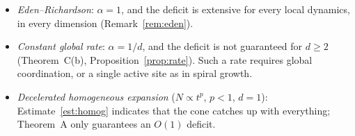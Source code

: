 \begin{remark}\label{rem:local}
\begin{itemize}[leftmargin=*,itemsep=1pt]
\item \emph{Eden--Richardson}: $\alpha=1$, and the deficit is extensive for every local dynamics, in every dimension (Remark~\ref{rem:eden}).
\item \emph{Constant global rate}: $\alpha=1/d$, and the deficit is not guaranteed for $d\ge2$ (Theorem~C(b), Proposition~\ref{prop:rate}). Such a rate requires global coordination, or a single active site as in spiral growth.
\item \emph{Decelerated homogeneous expansion} ($N\propto t^p$, $p<1$, $d=1$): Estimate~\ref{est:homog} indicates that the cone catches up with everything; Theorem~A only guarantees an $O(1)$ deficit.
\end{itemize}
\end{remark}
